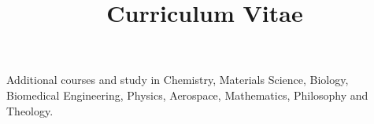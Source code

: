 \documentclass[skipsamekey,11pt,english]{curve}
\title{Curriculum Vitae}
\begin{document}
\makeheaders[c]
Additional courses and study in Chemistry, Materials Science, Biology, Biomedical Engineering, Physics, Aerospace, Mathematics, Philosophy and Theology.

\pagebreak




\end{document}
